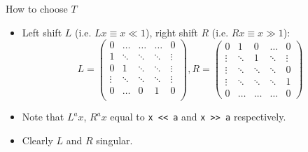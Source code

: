 \documentclass[10pt]{beamer}
\begin{document}
\begin{frame}[fragile,label={sec:orge8003ca}]{How to choose \(T\)}
 \begin{itemize}
\item Left shift \(L\) (i.e. \(Lx \equiv x \ll 1\)), right shift \(R\) (i.e. \(Rx \equiv x \gg 1\)):
$$L =
  \begin{pmatrix}
  0 & \ldots & \ldots & \ldots & 0 \\
  1 & \ddots & \ddots & \ddots & \vdots \\
  0 & 1 & \ddots & \ddots & \vdots \\
  \vdots & \ddots & \ddots & \ddots & \vdots \\
  0 & \ldots & 0 & 1 & 0 \\
  \end{pmatrix}, R =
  \begin{pmatrix}
      0 & 1 & 0 & \ldots & 0 \\
      \vdots & \ddots & 1      & \ddots & \vdots \\
      \vdots & \ddots & \ddots & \ddots & 0 \\
      \vdots & \ddots & \ddots & \ddots & 1 \\
      0 & \ldots & \ldots & \ldots      & 0
  \end{pmatrix}$$
\item Note that \(L^a x\), \(R^a x\) equal to \texttt{x << a} and \texttt{x >> a} respectively.
\item Clearly \(L\) and \(R\) singular.
\end{itemize}
\end{frame}
\end{document}
